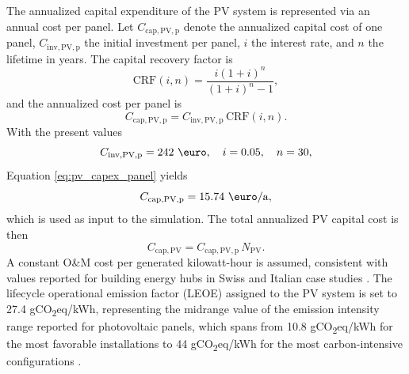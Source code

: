 \documentclass[12pt,a4paper]{report}
\begin{document}
The annualized capital expenditure of the PV system is represented via an annual cost per panel. Let \(C_{\mathrm{cap,PV,p}}\) denote the annualized capital cost of one panel, \(C_{\mathrm{inv,PV,p}}\) the initial investment per panel, \(i\) the interest rate, and \(n\) the lifetime in years. The capital recovery factor is
\begin{equation}
\mathrm{CRF}(i,n) = \frac{i(1+i)^{n}}{(1+i)^{n}-1},
\label{eq:crf_definition}
\end{equation}
and the annualized cost per panel is
\begin{equation}
C_{\mathrm{cap,PV,p}} = C_{\mathrm{inv,PV,p}}\,\mathrm{CRF}(i,n).
\label{eq:pv_capex_panel}
\end{equation}
With the present values
\begin{equation}
C_{\mathrm{inv,PV,p}} = 242~\mathrm{\text{\euro}}, \quad i = 0.05, \quad n = 30,
\label{eq:pv_capex_inputs}
\end{equation}
Equation \ref{eq:pv_capex_panel} yields
\begin{equation}
C_{\mathrm{cap,PV,p}} = 15.74~\mathrm{\text{\euro}/a},
\label{eq:pv_capex_numeric}
\end{equation}
which is used as input to the simulation. The total annualized PV capital cost is then
\begin{equation}
C_{\mathrm{cap,PV}} = C_{\mathrm{cap,PV,p}}\,N_{\mathrm{PV}}.
\label{eq:pv_capex_total}
\end{equation}
A constant O\&M cost per generated kilowatt-hour is assumed, consistent with values reported for building energy hubs in Swiss and Italian case studies \cite{tonellato2021optimaldesign}.  
The lifecycle operational emission factor (LEOE) assigned to the PV system is set to 27.4 gCO\textsubscript{2}eq/kWh, representing the midrange value of the emission intensity range reported for photovoltaic panels, which spans from 10.8 gCO\textsubscript{2}eq/kWh for the most favorable installations to 44 gCO\textsubscript{2}eq/kWh for the most carbon-intensive configurations \cite{PVCO2}.
\end{document}
